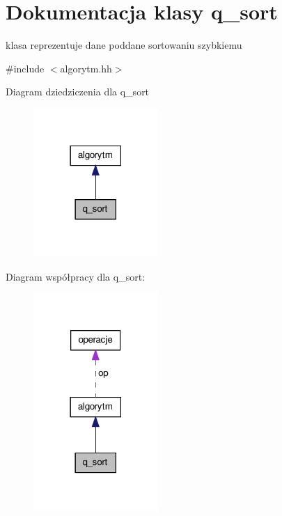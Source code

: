 \hypertarget{classq__sort}{\section{\-Dokumentacja klasy q\-\_\-sort}
\label{classq__sort}
}


klasa reprezentuje dane poddane sortowaniu szybkiemu  




{\ttfamily \#include $<$algorytm.\-hh$>$}



\-Diagram dziedziczenia dla q\-\_\-sort
\nopagebreak
\begin{figure}[H]
\begin{center}
\leavevmode
\includegraphics[width=134pt]{classq__sort__inherit__graph}
\end{center}
\end{figure}


\-Diagram współpracy dla q\-\_\-sort\-:
\nopagebreak
\begin{figure}[H]
\begin{center}
\leavevmode
\includegraphics[width=134pt]{classq__sort__coll__graph}
\end{center}
\end{figure}

